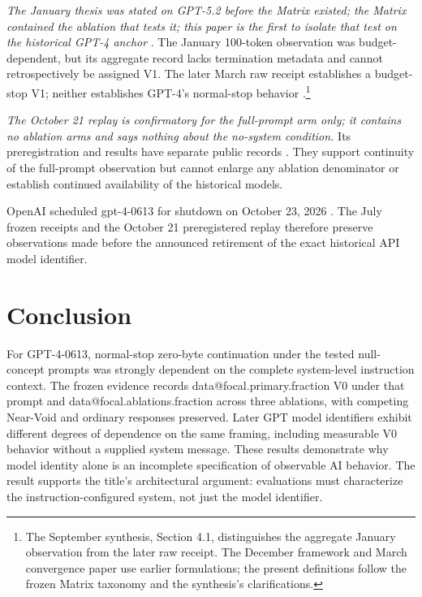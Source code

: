 \documentclass[11pt]{article}
\makeatletter
\newcommand{\D}[1]{\csname data@#1\endcsname}
\newcommand{\HistoricalBudget}{100}
\makeatother
\begin{document}
\emph{The January thesis was stated on GPT-5.2 before the Matrix existed; the Matrix contained the ablation that tests it; this paper is the first to isolate that test on the historical GPT-4 anchor} \citep{pal_alignment,pal_matrix}. The January \HistoricalBudget-token observation was budget-dependent, but its aggregate record lacks termination metadata and cannot retrospectively be assigned V1. The later March raw receipt establishes a budget-stop V1; neither establishes GPT-4's normal-stop behavior \citep{pal_alignment,pal_synthesis}.\footnote{The September synthesis, Section 4.1, distinguishes the aggregate January observation from the later raw receipt. The December framework and March convergence paper use earlier formulations; the present definitions follow the frozen Matrix taxonomy and the synthesis's clarifications.}

\emph{The October 21 replay is confirmatory for the full-prompt arm only; it contains no ablation arms and says nothing about the no-system condition.} Its preregistration and results have separate public records \citep{pal_replay_prereg,pal_replay_results}. They support continuity of the full-prompt observation but cannot enlarge any ablation denominator or establish continued availability of the historical models.

OpenAI scheduled gpt-4-0613 for shutdown on October 23, 2026 \citep{openai_deprecations}. The July frozen receipts and the October 21 preregistered replay therefore preserve observations made before the announced retirement of the exact historical API model identifier.

\section{Conclusion}
For GPT-4-0613, normal-stop zero-byte continuation under the tested null-concept prompts was strongly dependent on the complete system-level instruction context. The frozen evidence records \D{focal.primary.fraction} V0 under that prompt and \D{focal.ablations.fraction} across three ablations, with competing Near-Void and ordinary responses preserved. Later GPT model identifiers exhibit different degrees of dependence on the same framing, including measurable V0 behavior without a supplied system message. These results demonstrate why model identity alone is an incomplete specification of observable AI behavior. The result supports the title's architectural argument: evaluations must characterize the instruction-configured system, not just the model identifier.
\end{document}
